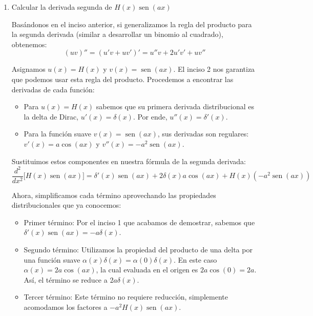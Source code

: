 \documentclass[11pt,spanish]{article}
\begin{document}
\begin{enumerate}
Dado que $\varphi$ y $\psi$ son funciones suaves, su derivada clásica existe y cumple la regla de Leibniz, $(\varphi\psi)' = \varphi'\psi + \varphi\psi'$. Reemplazando en la integral:
$$= \int_{-\infty}^{\infty} (\varphi'\psi + \varphi\psi') \phi \, dx = \langle \varphi'\psi + \varphi\psi', \phi \rangle$$

Esto prueba que la derivada distribucional coincide con la clásica regla del producto cuando trabajamos con funciones regulares. Esta regla es extensible al producto de una distribución y una función infinitamente diferenciable.

\item Calcular la derivada segunda de $H(x)\operatorname{sen}(ax)$

Basándonos en el inciso anterior, si generalizamos la regla del producto para la segunda derivada (similar a desarrollar un binomio al cuadrado), obtenemos:
$$(uv)'' = (u'v + uv')' = u''v + 2u'v' + uv''$$

Asignamos $u(x) = H(x)$ y $v(x) = \operatorname{sen}(ax)$. El inciso 2 nos garantiza que podemos usar esta regla del producto. Procedemos a encontrar las derivadas de cada función:
\begin{itemize}
\item Para $u(x) = H(x)$ sabemos que su primera derivada distribucional es la delta de Dirac, $u'(x) = \delta(x)$. Por ende, $u''(x) = \delta'(x)$.
\item Para la función suave $v(x) = \operatorname{sen}(ax)$, sus derivadas son regulares: $v'(x) = a\cos(ax)$ y $v''(x) = -a^2\operatorname{sen}(ax)$.
\end{itemize}

Sustituimos estos componentes en nuestra fórmula de la segunda derivada:
$$\frac{d^2}{dx^2}\bigl[H(x)\operatorname{sen}(ax)\bigr] = \delta'(x)\operatorname{sen}(ax) + 2\delta(x)a\cos(ax) + H(x)(-a^2\operatorname{sen}(ax))$$

Ahora, simplificamos cada término aprovechando las propiedades distribucionales que ya conocemos:
\begin{itemize}
\item Primer término: Por el inciso 1 que acabamos de demostrar, sabemos que $\delta'(x)\operatorname{sen}(ax) = -a\delta(x)$.
\item Segundo término: Utilizamos la propiedad del producto de una delta por una función suave $\alpha(x)\delta(x) = \alpha(0)\delta(x)$. En este caso $\alpha(x) = 2a\cos(ax)$, la cual evaluada en el origen es $2a\cos(0) = 2a$. Así, el término se reduce a $2a\delta(x)$.
\item Tercer término: Este término no requiere reducción, simplemente acomodamos los factores a $-a^2 H(x)\operatorname{sen}(ax)$.
\end{itemize}


\end{enumerate}
\end{document}
